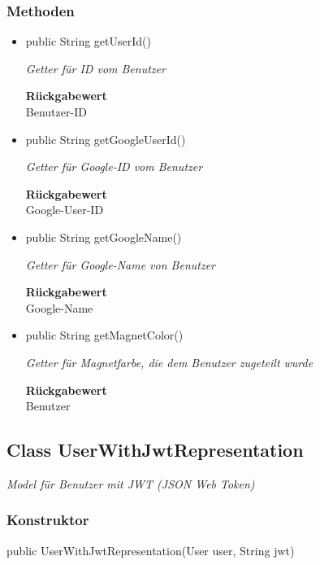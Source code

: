 \documentclass[a4paper]{scrreprt}
\begin{document}
        \subsubsection{Methoden}
        \begin{itemize}
        	\item{public String getUserId()}
        	
        	\textit{Getter für ID vom Benutzer}
        	
        	
        	
        	\textbf{Rückgabewert} \\
        	Benutzer-ID        \item{public String getGoogleUserId()}
        	
        	\textit{Getter für Google-ID vom Benutzer}
        	
        	
        	
        	\textbf{Rückgabewert} \\
        	Google-User-ID        \item{public String getGoogleName()}
        	
        	\textit{Getter für Google-Name von Benutzer}
        	
        	
        	
        	\textbf{Rückgabewert} \\
        	Google-Name        \item{public String getMagnetColor()}
        	
        	\textit{Getter für Magnetfarbe, die dem Benutzer zugeteilt wurde}
        	
        	
        	
        	\textbf{Rückgabewert} \\
        	Benutzer
        \end{itemize}
        \subsection{Class UserWithJwtRepresentation}
        \textit{Model für Benutzer mit JWT (JSON Web Token)}
        \subsubsection{Konstruktor}
        public UserWithJwtRepresentation(User user, String jwt)
\end{document}
